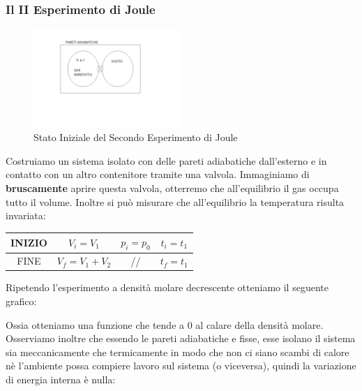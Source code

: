 \documentclass{article}
\begin{document}
\subsubsection{Il II Esperimento di Joule}
\begin{figure}[H]
    \centering
    \includegraphics[width=0.5\textwidth]{SecondoJoule.png}
    \caption{Stato Iniziale del Secondo Esperimento di Joule}
    \label{SecondoJoule}
\end{figure}
Costruiamo un sistema isolato con delle pareti adiabatiche dall'esterno e in contatto con un altro contenitore tramite una valvola. Immaginiamo di \textbf{bruscamente} aprire questa valvola, otterremo che all'equilibrio il gas occupa tutto il volume. Inoltre si può misurare che all'equilibrio la temperatura risulta invariata:\\
\begin{center}
\begin{tabular}{c|c|c|c}
    INIZIO & $V_i=V_1$ & $p_i=p_0$ & $t_i=t_1$ \\
    \hline
    FINE & $V_f=V_1+V_2$ & // & $t_f=t_1$
\end{tabular} 
\end{center}
Ripetendo l'esperimento a densità molare decrescente otteniamo il seguente grafico:\\
\begin{center}
\end{center}
Ossia otteniamo una funzione che tende a 0 al calare della densità molare. Osserviamo inoltre che essendo le pareti adiabatiche e fisse, esse isolano il sistema sia meccanicamente che termicamente in modo che non ci siano scambi di calore nè l'ambiente possa compiere lavoro sul sistema (o viceversa), quindi la variazione di energia interna è nulla:
\end{document}
